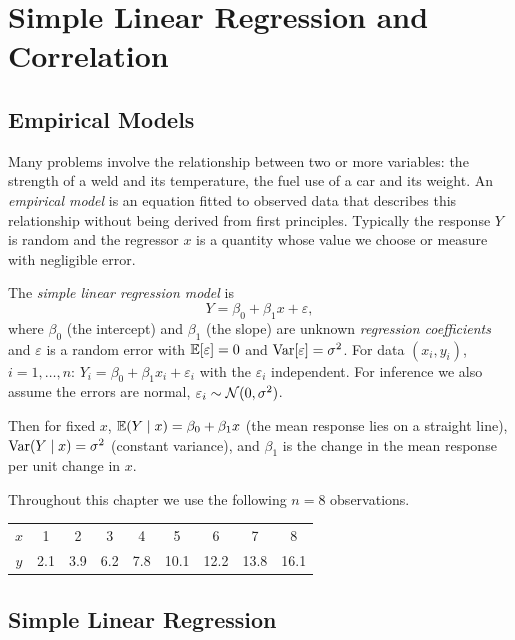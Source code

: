 \chapter{Simple Linear Regression and Correlation}

\section{Empirical Models}

Many problems involve the relationship between two or more variables: the strength of a weld and its temperature, the fuel use of a car and its weight. An \emph{empirical model} is an equation fitted to observed data that describes this relationship without being derived from first principles. Typically the response $Y$ is random and the regressor $x$ is a quantity whose value we choose or measure with negligible error.

\begin{definition}
The \emph{simple linear regression model} is
\[ Y=\beta_0+\beta_1x+\varepsilon, \]
where $\beta_0$ (the intercept) and $\beta_1$ (the slope) are unknown \emph{regression coefficients} and $\varepsilon$ is a random error with $\mathbb{E}[\varepsilon]=0$ and $\operatorname{Var}[\varepsilon]=\sigma^2$. For data $(x_i,y_i)$, $i=1,\dots,n$: $Y_i=\beta_0+\beta_1x_i+\varepsilon_i$ with the $\varepsilon_i$ independent. For inference we also assume the errors are normal, $\varepsilon_i\sim\mathcal{N}(0,\sigma^2)$.
\end{definition}

Then for fixed $x$, $\mathbb{E}(Y\mid x)=\beta_0+\beta_1x$ (the mean response lies on a straight line), $\operatorname{Var}(Y\mid x)=\sigma^2$ (constant variance), and $\beta_1$ is the change in the mean response per unit change in $x$.

\begin{example}\label{ex:regdata}
Throughout this chapter we use the following $n=8$ observations.
\begin{center}
\begin{tabular}{c|cccccccc}
\toprule
$x$ & 1 & 2 & 3 & 4 & 5 & 6 & 7 & 8\\
$y$ & 2.1 & 3.9 & 6.2 & 7.8 & 10.1 & 12.2 & 13.8 & 16.1\\
\bottomrule
\end{tabular}
\end{center}
\end{example}

\section{Simple Linear Regression}

